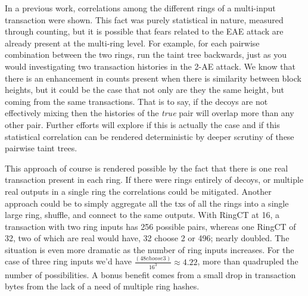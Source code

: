In a previous work, correlations among the different rings of a multi-input transaction were shown.   \cite{Borggren2020a}
This fact was purely statistical in nature, measured through counting, but it is possible that fears related to the EAE attack are already present at the multi-ring level.  
For example, for each pairwise combination between the two rings, run the taint tree backwards, just as you would investigating two transaction histories in the 2-AE attack. 
We know that there is an enhancement in counts present when there is similarity between block heights, but it could be the case that not only are they the same height, but coming from the same transactions.  
That is to say, if the decoys are not effectively mixing then the histories of the \textit{true} pair will overlap more than any other pair.
Further efforts will explore if this is actually the case and if this statistical correlation can be rendered deterministic by deeper scrutiny of these pairwise taint trees.  

This approach of course is rendered possible by the fact that there is one real transaction present in each ring.  
If there were rings entirely of decoys, or multiple real outputs in a single ring the correlations could be mitigated.
Another approach could be to simply aggregate all the txs of all the rings into a single large ring, shuffle, and connect to the same outputs.
With RingCT at 16, a transaction with two ring inputs has 256 possible pairs, whereas one RingCT of 32, two of which are real would have, 32 choose 2 or 496; nearly doubled.
The situation is even more dramatic as the number of ring inputs increases.  For the case of three ring inputs we'd have $\frac{(48 choose 3)}{16^3} \approx 4.22$, more than quadrupled the number of possibilities.    
A bonus benefit comes from a small drop in transaction bytes from the lack of a need of multiple ring hashes.


